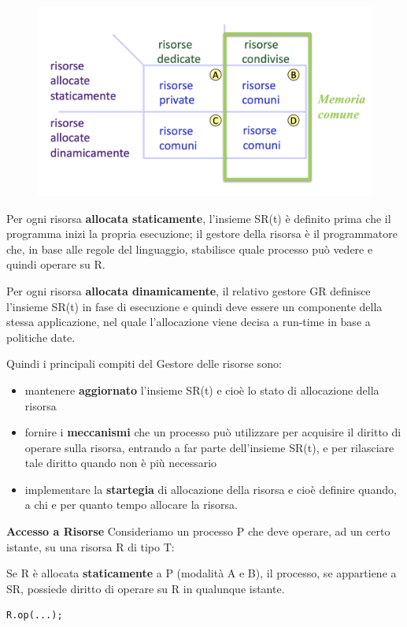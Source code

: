 \documentclass{article}
\begin{document}
\begin{figure}[htbp]
    \centering
    \includegraphics[width=0.50\columnwidth]{imgs/tipologie_allocazione.png}
\end{figure}

Per ogni risorsa \textbf{allocata staticamente}, l'insieme SR(t) è definito prima che il programma inizi la propria esecuzione; il gestore della risorsa è il programmatore che,
in base alle regole del linguaggio, stabilisce quale processo può vedere e quindi operare su R.


Per ogni risorsa \textbf{allocata dinamicamente}, il relativo gestore GR definisce l'insieme SR(t) in fase di esecuzione e quindi deve essere un componente della stessa applicazione,
nel quale l'allocazione viene decisa a run-time in base a politiche date.

\vspace{5mm}
Quindi i principali compiti del Gestore delle risorse sono:
\begin{itemize}
    \item mantenere \textbf{aggiornato} l'insieme SR(t) e cioè lo stato di allocazione della risorsa
    \item fornire i \textbf{meccanismi} che un processo può utilizzare per acquisire il diritto di operare sulla risorsa, entrando a far parte dell'insieme SR(t), e per rilasciare
    tale diritto quando non è più necessario
    \item implementare la \textbf{startegia} di allocazione della risorsa e cioè definire quando, a chi e per quanto tempo allocare la risorsa.
\end{itemize}

\vspace{5mm}
{\large \textbf{Accesso a Risorse}}
Consideriamo un processo P che deve operare, ad un certo istante, su una risorsa R di tipo T:

Se R è allocata \textbf{staticamente} a P (modalità A e B), il processo, se appartiene a SR, possiede diritto di operare su R in qualunque istante.
\vspace{3mm}
\begin{lstlisting}
R.op(...);
\end{lstlisting}
\end{document}
